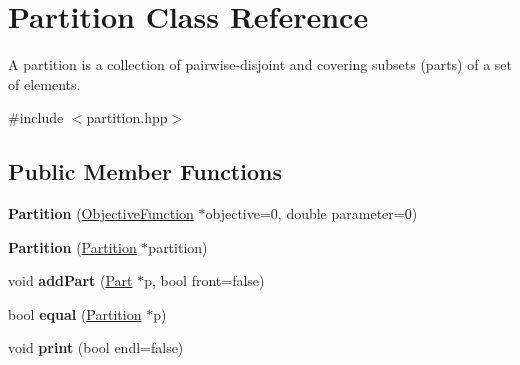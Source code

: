 \hypertarget{classPartition}{\section{Partition Class Reference}
\label{classPartition}
}


A partition is a collection of pairwise-\/disjoint and covering subsets (parts) of a set of elements.  




{\ttfamily \#include $<$partition.\-hpp$>$}

\subsection*{Public Member Functions}
\begin{DoxyCompactItemize}
\item 
\hypertarget{classPartition_ab2274b9cf773fea65da75facdf88ae98}{{\bfseries Partition} (\hyperlink{classObjectiveFunction}{Objective\-Function} $\ast$objective=0, double parameter=0)}\label{classPartition_ab2274b9cf773fea65da75facdf88ae98}

\item 
\hypertarget{classPartition_acb291b3b0ccf48005e141be32fdd7efd}{{\bfseries Partition} (\hyperlink{classPartition}{Partition} $\ast$partition)}\label{classPartition_acb291b3b0ccf48005e141be32fdd7efd}

\item 
\hypertarget{classPartition_a63f82a3a75dc0c3d0d27766b2459c9fe}{void {\bfseries add\-Part} (\hyperlink{classPart}{Part} $\ast$p, bool front=false)}\label{classPartition_a63f82a3a75dc0c3d0d27766b2459c9fe}

\item 
\hypertarget{classPartition_abced08b339e293866a614b2f21414375}{bool {\bfseries equal} (\hyperlink{classPartition}{Partition} $\ast$p)}\label{classPartition_abced08b339e293866a614b2f21414375}

\item 
\hypertarget{classPartition_a3463b34ab90d020ed40635c473301a64}{void {\bfseries print} (bool endl=false)}\label{classPartition_a3463b34ab90d020ed40635c473301a64}

\end{DoxyCompactItemize}
